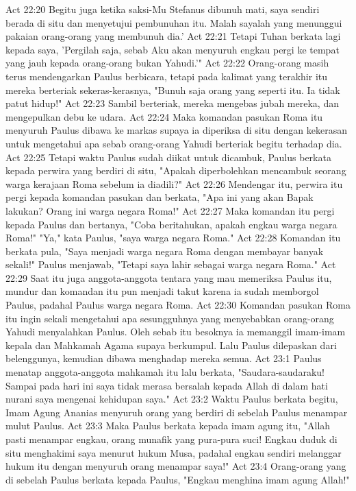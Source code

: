 Act 22:20  Begitu juga ketika saksi-Mu Stefanus dibunuh mati, saya sendiri berada di situ dan menyetujui pembunuhan itu. Malah sayalah yang menunggui pakaian orang-orang yang membunuh dia.'
Act 22:21  Tetapi Tuhan berkata lagi kepada saya, 'Pergilah saja, sebab Aku akan menyuruh engkau pergi ke tempat yang jauh kepada orang-orang bukan Yahudi.'"
Act 22:22  Orang-orang masih terus mendengarkan Paulus berbicara, tetapi pada kalimat yang terakhir itu mereka berteriak sekeras-kerasnya, "Bunuh saja orang yang seperti itu. Ia tidak patut hidup!"
Act 22:23  Sambil berteriak, mereka mengebas jubah mereka, dan mengepulkan debu ke udara.
Act 22:24  Maka komandan pasukan Roma itu menyuruh Paulus dibawa ke markas supaya ia diperiksa di situ dengan kekerasan untuk mengetahui apa sebab orang-orang Yahudi berteriak begitu terhadap dia.
Act 22:25  Tetapi waktu Paulus sudah diikat untuk dicambuk, Paulus berkata kepada perwira yang berdiri di situ, "Apakah diperbolehkan mencambuk seorang warga kerajaan Roma sebelum ia diadili?"
Act 22:26  Mendengar itu, perwira itu pergi kepada komandan pasukan dan berkata, "Apa ini yang akan Bapak lakukan? Orang ini warga negara Roma!"
Act 22:27  Maka komandan itu pergi kepada Paulus dan bertanya, "Coba beritahukan, apakah engkau warga negara Roma!" "Ya," kata Paulus, "saya warga negara Roma."
Act 22:28  Komandan itu berkata pula, "Saya menjadi warga negara Roma dengan membayar banyak sekali!" Paulus menjawab, "Tetapi saya lahir sebagai warga negara Roma."
Act 22:29  Saat itu juga anggota-anggota tentara yang mau memeriksa Paulus itu, mundur dan komandan itu pun menjadi takut karena ia sudah memborgol Paulus, padahal Paulus warga negara Roma.
Act 22:30  Komandan pasukan Roma itu ingin sekali mengetahui apa sesungguhnya yang menyebabkan orang-orang Yahudi menyalahkan Paulus. Oleh sebab itu besoknya ia memanggil imam-imam kepala dan Mahkamah Agama supaya berkumpul. Lalu Paulus dilepaskan dari belenggunya, kemudian dibawa menghadap mereka semua.
Act 23:1  Paulus menatap anggota-anggota mahkamah itu lalu berkata, "Saudara-saudaraku! Sampai pada hari ini saya tidak merasa bersalah kepada Allah di dalam hati nurani saya mengenai kehidupan saya."
Act 23:2  Waktu Paulus berkata begitu, Imam Agung Ananias menyuruh orang yang berdiri di sebelah Paulus menampar mulut Paulus.
Act 23:3  Maka Paulus berkata kepada imam agung itu, "Allah pasti menampar engkau, orang munafik yang pura-pura suci! Engkau duduk di situ menghakimi saya menurut hukum Musa, padahal engkau sendiri melanggar hukum itu dengan menyuruh orang menampar saya!"
Act 23:4  Orang-orang yang di sebelah Paulus berkata kepada Paulus, "Engkau menghina imam agung Allah!"
